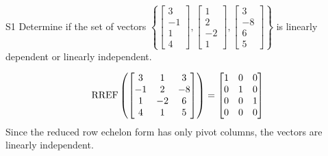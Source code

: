 \begin{problem}{S1}
Determine if the set of vectors $\left\{\begin{bmatrix} 3 \\ -1 \\ 1 \\ 4 \end{bmatrix}, \begin{bmatrix} 1  \\ 2 \\ -2 \\ 1 \end{bmatrix}, \begin{bmatrix} 3 \\ -8 \\ 6 \\ 5 \end{bmatrix} \right\}$  is linearly dependent or linearly independent.
\end{problem}
\begin{solution}
$$\operatorname{RREF}\left(\begin{bmatrix} 3 & 1 & 3 \\ -1 & 2 & -8 \\ 1 & -2 & 6 \\ 4 & 1 & 5 \end{bmatrix} \right) = \begin{bmatrix} 1 & 0 & 0 \\ 0 & 1 & 0 \\ 0 & 0 & 1 \\ 0 & 0 & 0 \end{bmatrix}$$
Since the reduced row echelon form has only pivot columns, the vectors are linearly independent.
\end{solution}

